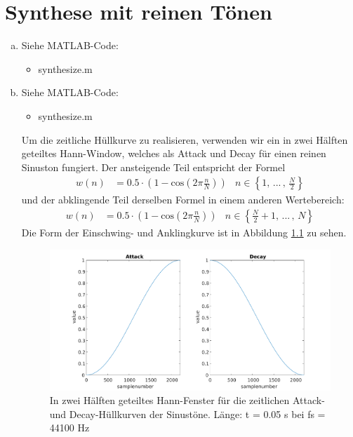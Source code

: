 \chapter{Synthese mit reinen Tönen}


\begin{enumerate}[a)]
\item Siehe MATLAB-Code:
\begin{itemize}
\item
synthesize.m
\end{itemize}
\item
Siehe MATLAB-Code:
\begin{itemize}
\item
synthesize.m
\end{itemize}
\vspace{\baselineskip}
Um die zeitliche Hüllkurve zu realisieren, verwenden wir ein in zwei Hälften geteiltes Hann-Window, welches als Attack und Decay für einen reinen Sinuston fungiert. Der ansteigende Teil entspricht der Formel
\begin{align*}
w(n) &= 0.5 \cdot (1- \mathrm{cos}(2 \pi \frac{n}{N})) & n \in \left\{1,\,...\,,\,\frac{N}{2}\right\}
\end{align*}
und der abklingende Teil derselben Formel in einem anderen Wertebereich:
\begin{align*}
w(n) &= 0.5 \cdot (1- \mathrm{cos}(2 \pi \frac{n}{N})) & n \in \left\{\frac{N}{2}+1,\,...\,,\,N\right\}
\end{align*}
Die Form der Einschwing- und Anklingkurve ist in Abbildung \ref{fig:env} zu sehen.
\begin{figure}
  \centering
      \includegraphics[width=\textwidth]{Figures/envelopeplot}
 \caption{In zwei Hälften geteiltes Hann-Fenster für die zeitlichen Attack- und Decay-Hüllkurven der Sinustöne. Länge: t = 0.05 s bei fs = 44100 Hz}
	\label{fig:env}
\end{figure}

\end{enumerate}
